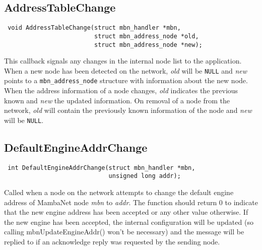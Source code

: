 \subsection{AddressTableChange}
\begin{verbatim}
 void AddressTableChange(struct mbn_handler *mbn,
                         struct mbn_address_node *old,
                         struct mbn_address_node *new);
\end{verbatim}
This callback signals any changes in the internal node list to the application. When a new node has been detected on the network, \textit{old} will be \verb|NULL| and \textit{new} points to a \verb|mbn_address_node| structure with information about the new node. When the address information of a node changes, \textit{old} indicates the previous known and \textit{new} the updated information. On removal of a node from the network, \textit{old} will contain the previously known information of the node and \textit{new} will be \verb|NULL|.


\subsection{DefaultEngineAddrChange}
\begin{verbatim}
 int DefaultEngineAddrChange(struct mbn_handler *mbn,
                             unsigned long addr);
\end{verbatim}
Called when a node on the network attempts to change the default engine address of MambaNet node \textit{mbn} to \textit{addr}. The function should return 0 to indicate that the new engine address has been accepted or any other value otherwise. If the new engine has been accepted, the internal configuration will be updated (so calling mbnUpdateEngineAddr() won't be necessary) and the message will be replied to if an acknowledge reply was requested by the sending node.


